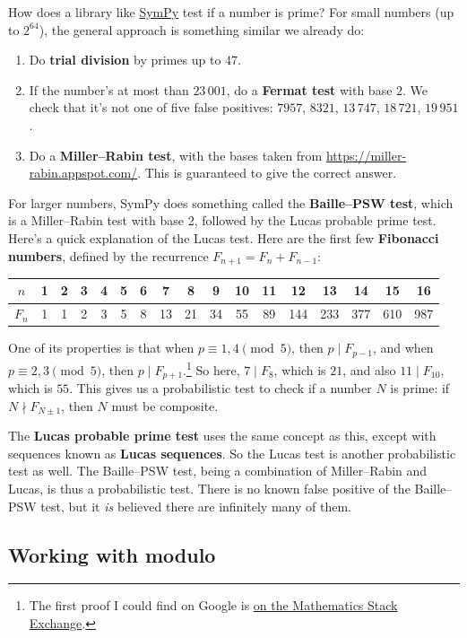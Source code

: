 \documentclass[11pt,paper=letter]{scrartcl}
\begin{document}
How does a library like \href{https://docs.sympy.org/latest/_modules/sympy/ntheory/primetest.html}{SymPy} test if a number is prime? For small numbers (up to $2^{64}$), the general approach is something similar we already do:
\begin{enumerate}
  \item Do \textbf{trial division} by primes up to $47$.
  \item If the number's at most than $23\,001$, do a \textbf{Fermat test} with base $2$. We check that it's not one of five false positives: $7957$, $8321$, $13\,747$, $18\,721$, $19\,951$.
  \item Do a \textbf{Miller--Rabin test}, with the bases taken from \url{https://miller-rabin.appspot.com/}. This is guaranteed to give the correct answer.
\end{enumerate}
For larger numbers, SymPy does something called the \textbf{Baille--PSW test}, which is a Miller--Rabin test with base 2, followed by the Lucas probable prime test. Here's a quick explanation of the Lucas test. Here are the first few \textbf{Fibonacci numbers}, defined by the recurrence $F_{n+1} = F_n + F_{n-1}$:
\begin{center}
  \begin{tabular}{c|cccccccccccccccc}
  $n$ & 1 & 2 & 3 & 4 & 5 & 6 & 7 & 8 & 9 & 10 & 11 & 12 & 13 & 14 & 15 & 16 \\ \hline
  $F_n$ & 1 & 1 & 2 & 3 & 5 & 8 & 13 & 21 & 34 & 55 & 89 & 144 & 233 & 377 & 610 & 987
  \end{tabular}
\end{center}
One of its properties is that when $p \equiv 1, 4 \pmod 5$, then $p \mid F_{p-1}$, and when $p \equiv 2, 3 \pmod 5$, then $p \mid F_{p+1}$.\footnote{The first proof I could find on Google is \href{https://math.stackexchange.com/a/696599/}{on the Mathematics Stack Exchange}.} So here, $7 \mid F_8$, which is $21$, and also $11 \mid F_{10}$, which is $55$. This gives us a probabilistic test to check if a number $N$ is prime: if $N \nmid F_{N \pm 1}$, then $N$ must be composite.

The \textbf{Lucas probable prime test} uses the same concept as this, except with sequences known as \textbf{Lucas sequences}. So the Lucas test is another probabilistic test as well. The Baille--PSW test, being a combination of Miller--Rabin and Lucas, is thus a probabilistic test. There is no known false positive of the Baille--PSW test, but it \emph{is} believed there are infinitely many of them.

\subsection{Working with modulo}
\end{document}

